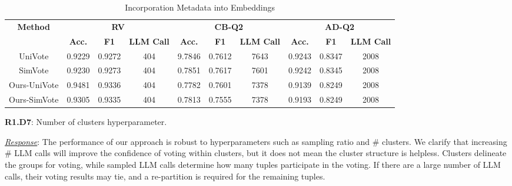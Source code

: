 \documentclass[sigconf]{acmart}
\begin{document}
\begin{table}[t]
    \centering
    \tiny
    \caption{Incorporation Metadata into Embeddings}
    \vspace{-2ex}
    \label{response:tab:auxiliary}
    \setlength{\tabcolsep}{3pt}
    \begin{tabular}{c|ccc|ccc|ccc}
    \toprule
    \multirow{2}{*}{\bf Method} & \multicolumn{3}{c}{\textbf{RV}} & \multicolumn{3}{c}{\textbf{CB-Q2}} & \multicolumn{3}{c}{\textbf{AD-Q2}} \\
    \cmidrule(lr){2-4} \cmidrule(lr){5-7} \cmidrule(lr){8-10}
    & \textbf{Acc.} & \textbf{F1} &\textbf{LLM Call} & \textbf{Acc.} & \textbf{F1} & \textbf{LLM Call} & \textbf{Acc.} & \textbf{F1} & \textbf{LLM Call} \\
    \midrule
    UniVote & 0.9229 & 0.9272 & 404 & 9.7846 & 0.7612 & 7643 & 0.9243 & 0.8347 & 2008 \\
    SimVote & 0.9230 & 0.9273 & 404 & 0.7851 & 0.7617 & 7601 & 0.9242 & 0.8345 & 2008 \\
    Ours-UniVote & 0.9481 & 0.9336 & 404 & 0.7782 & 0.7601 & 7378 & 0.9139 & 0.8249 & 2008 \\
    Ours-SimVote & 0.9305 & 0.9335 & 404 & 0.7813 & 0.7555 & 7378 & 0.9193 & 0.8249 & 2008 \\
    \bottomrule
    \end{tabular}
\end{table}

{\noindent \textbf{R1.D7}}: Number of clusters hyperparameter.

{\noindent \underline{\sl Response}:}
The performance of our approach is robust to hyperparameters such as sampling ratio and \# clusters. 
We clarify that increasing \# LLM calls will improve the confidence of voting within clusters, but it does not mean the cluster structure is helpless. Clusters delineate the groups for voting, while sampled LLM calls determine how many tuples participate in the voting. If there are a large number of LLM calls, their voting results may tie, and a re-partition is required for the remaining tuples. 
\end{document}
